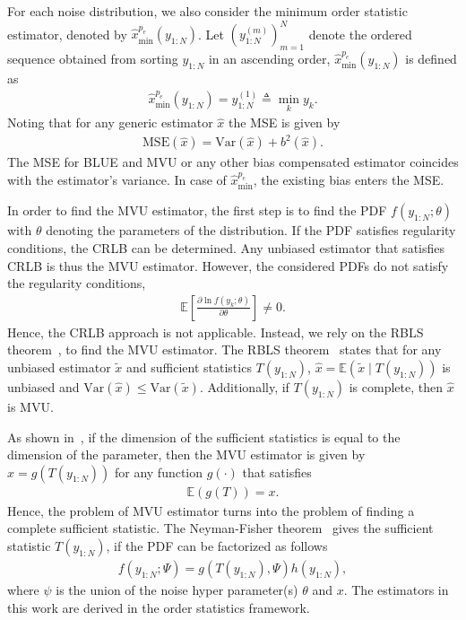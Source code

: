 \documentclass{article}
\newcommand{\E}{\mathbb{E}}
\newcommand{\Var}{\mathrm{Var}}
\newcommand{\MSE}{\mathrm{MSE}}
\begin{document}
For each noise distribution, we also consider the minimum order statistic estimator, denoted by $\hat{x}^{p_e}_{\mathrm{min}}(y_{1:N})$. Let $\left(y^{(m)}_{1:N}\right)_{m=1}^{N}$ denote the ordered sequence obtained from sorting $y_{1:N}$ in an ascending order, $\hat{x}^{p_e}_{\mathrm{min}}(y_{1:N})$ is defined as
%
%
\begin{align}
	\hat{x}^{p_e}_{\mathrm{min}}(y_{1:N}) = y_{1:N}^{(1)} \triangleq \min_{k} y_k.
\end{align}
%
%
Noting that for any generic estimator $\hat{x}$ the MSE is given by
%
%
\begin{align}\label{eq:mse_generic}
\MSE(\hat{x}) = \Var(\hat{x}) + b^2(\hat{x}).
\end{align}
%
%
The MSE for BLUE and MVU or any other bias compensated estimator coincides with the estimator's variance. In case of $\hat{x}^{p_e}_{\mathrm{min}}$, the existing bias enters the MSE.

In order to find the MVU estimator, the first step is to find the PDF $f(y_{1:N};\theta)$ with $\theta$ denoting the parameters of the distribution. If the PDF satisfies regularity conditions, the CRLB can be determined. Any unbiased estimator that satisfies CRLB is thus the MVU estimator. However, the considered PDFs do not satisfy the regularity conditions,
%
%
\begin{align}
\E\left[\frac{\partial\ln f(y_k;\theta)}{\partial \theta}\right]\neq0.
\end{align}
%
%
Hence, the CRLB approach is not applicable. Instead, we rely on the RBLS theorem~\cite{article:IJS_lehmann_1,article:IJS_lehmann_2,book:ET_kay_93}, to find the MVU estimator. The RBLS theorem~\cite{article:IJS_lehmann_1} states that for any unbiased estimator $\tilde{x}$ and sufficient statistics $T(y_{1:N})$, $\hat{x}=\E(\tilde{x}\mid T(y_{1:N}))$ is unbiased and $\Var(\hat{x})\leq\Var(\tilde{x})$. Additionally, if $T(y_{1:N})$ is complete, then $\hat{x}$ is MVU.

As shown in~\cite{book:ET_kay_93}, if the dimension of the sufficient statistics is equal to the dimension of the parameter, then the MVU estimator is given by $\hat{x}=g(T(y_{1:N}))$ for any function $g(\cdot)$ that satisfies
%
%
\begin{align}
\E(g(T)) = x.
\end{align}
%
%
Hence, the problem of MVU estimator turns into the problem of finding a complete sufficient statistic. The Neyman-Fisher theorem~\cite{article:fisher_22,article:AMS_halmos_49} gives the sufficient statistic $T(y_{1:N})$, if the PDF can be factorized as follows
%
%
\begin{align}
f(y_{1:N};\Psi) =g(T(y_{1:N}),\Psi)h(y_{1:N}),
\end{align}
%
%
where $\psi$ is the union of the noise hyper parameter(s) $\theta$ and $x$. The estimators in this work are derived in the order statistics framework. 
%
%
\end{document}
